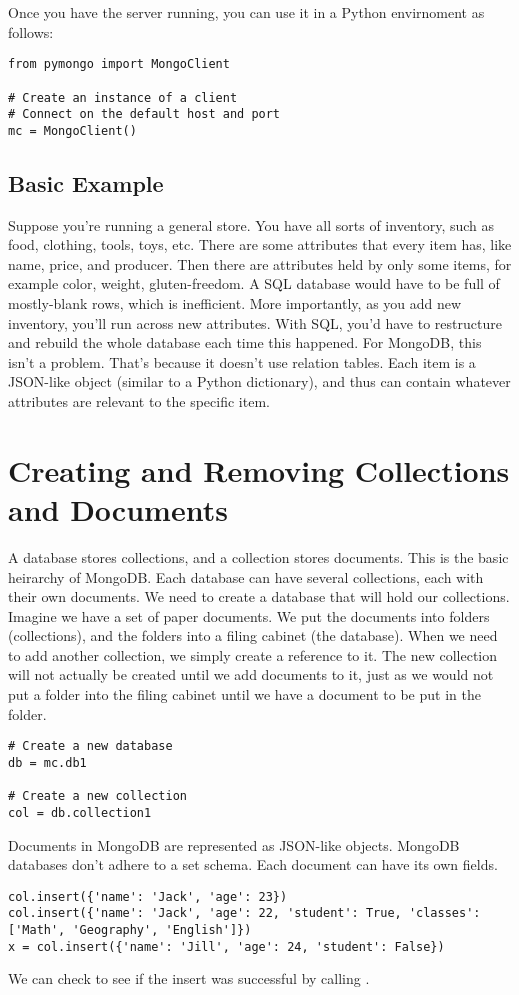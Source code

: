 Once you have the server running, you can use it in a Python envirnoment as follows:

\begin{lstlisting}
from pymongo import MongoClient

# Create an instance of a client
# Connect on the default host and port
mc = MongoClient()
\end{lstlisting}

\subsection*{Basic Example}
Suppose you're running a general store. You have all sorts of inventory, such as food, clothing, tools, toys, etc.  There are some attributes that every item has, like name, price, and producer.  Then there are attributes held by only some items, for example color, weight, gluten-freedom.  A SQL database would have to be full of mostly-blank rows, which is inefficient.  More importantly, as you add new inventory, you'll run across new attributes. With SQL, you'd have to restructure and rebuild the whole database each time this happened. For MongoDB, this isn't a problem. That's because it doesn't use relation tables. Each item is a JSON-like object (similar to a Python dictionary), and thus can contain whatever attributes are relevant to the specific item.

\section*{Creating and Removing Collections and Documents}
A database stores collections, and a collection stores documents. This is the basic heirarchy of MongoDB.  Each database can have several collections, each with their own documents.  We need to create a database that will hold our collections.  Imagine we have a set of paper documents.  We put the documents into folders (collections), and the folders into a filing cabinet (the database).  When we need to add another collection, we simply create a reference to it.  The new collection will not actually be created until we add documents to it, just as we would not put a folder into the filing cabinet until we have a document to be put in the folder.
\begin{lstlisting}
# Create a new database
db = mc.db1

# Create a new collection
col = db.collection1
\end{lstlisting}

Documents in MongoDB are represented as JSON-like objects.
MongoDB databases don't adhere to a set schema.
Each document can have its own fields.
\begin{lstlisting}
col.insert({'name': 'Jack', 'age': 23})
col.insert({'name': 'Jack', 'age': 22, 'student': True, 'classes': ['Math', 'Geography', 'English']})
x = col.insert({'name': 'Jill', 'age': 24, 'student': False})
\end{lstlisting}
We can check to see if the insert was successful by calling .

